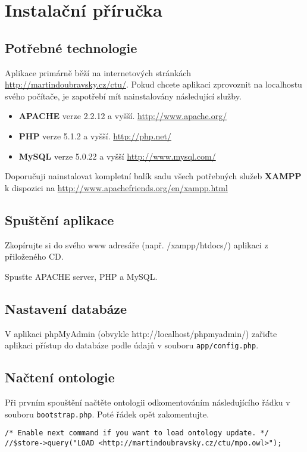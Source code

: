 \chapter{Instalační příručka}

\section{Potřebné technologie}

Aplikace primárně běží na internetových stránkách \url{http://martindoubravsky.cz/ctu/}. 
Pokud chcete aplikaci zprovoznit na localhostu svého počítače, je zapotřebí mít nainstalovány následující služby.

\begin{itemize}
\item \textbf{APACHE} verze 2.2.12 a vyšší. \url{http://www.apache.org/}
\item \textbf{PHP} verze 5.1.2 a vyšší. \url{http://php.net/}
\item \textbf{MySQL} verze 5.0.22 a vyšší \url{http://www.mysql.com/}
\end{itemize}

Doporučuji nainstalovat kompletní balík sadu všech potřebných služeb \textbf{XAMPP} k dispozici na \url{http://www.apachefriends.org/en/xampp.html}

\section{Spuštění aplikace}

Zkopírujte si do svého www adresáře (např. /xampp/htdocs/) aplikaci z přiloženého CD.

Spusťte APACHE server, PHP a MySQL.

\section{Nastavení databáze}

V aplikaci phpMyAdmin (obvykle http://localhost/phpmyadmin/) zařiďte aplikaci přístup do databáze podle údajů v souboru \verb|app/config.php|.

\section{Načtení ontologie}

Při prvním spouštění načtěte ontologii odkomentováním následujícího řádku v souboru \verb|bootstrap.php|. Poté řádek opět zakomentujte.
\begin{verbatim}
/* Enable next command if you want to load ontology update. */
//$store->query("LOAD <http://martindoubravsky.cz/ctu/mpo.owl>");
\end{verbatim}